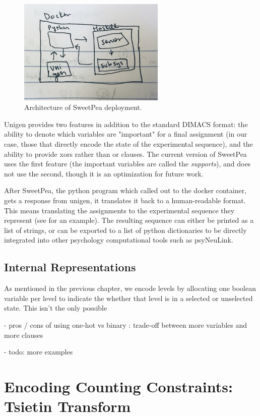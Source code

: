 \begin{figure}[t]
    \centerline{\includegraphics[origin=c,width=7cm]{fig_architecture}}
    \caption{Architecture of SweetPea deployment.}%
    \label{fig:fig_architecture}%
\end{figure}

Unigen provides two features in addition to the standard DIMACS format: the ability to denote which variables are "important" for a final assignment (in our case, those that directly encode the state of the experimental sequence), and the ability to provide xors rather than or clauses. The current version of SweetPea uses the first feature (the important variables are called the \emph{supports}), and does not use the second, though it is an optimization for future work.

After SweetPea, the python program which called out to the docker container, gets a response from unigen, it translates it back to a human-readable format. This means translating the assignments to the experimental sequence they represent (see  for an example). The resulting sequence can either be printed as a list of strings, or can be exported to a list of python dictionaries to be directly integrated into other psychology computational tools such as psyNeuLink.

\subsection{Internal Representations}

As mentioned in the previous chapter, we encode levels by allocating one boolean variable per level to indicate the whether that level is in a selected or unselected state. This isn't the only possible


- pros / cons of using one-hot vs binary : trade-off between more variables and more clauses

- todo: more examples

\section{Encoding Counting Constraints: Tsietin Transform}
\cite{tseitin1983complexity}

